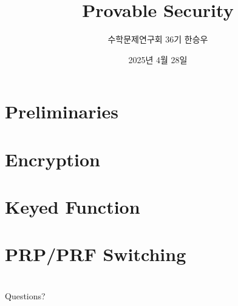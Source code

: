 \documentclass[handout]{beamer}
\title{Provable Security}
\author{수학문제연구회 36기 한승우}
\date{2025년 4월 28일}
\begin{document}
\begin{frame}
    \titlepage
\end{frame}

\section{Preliminaries}


\section{Encryption}


\section{Keyed Function}


\section{PRP/PRF Switching}

%
% 

\section*{\mbox{}}
\begin{frame}{}
    \begin{center}
        Questions?
    \end{center}
\end{frame}
% 
\end{document}

